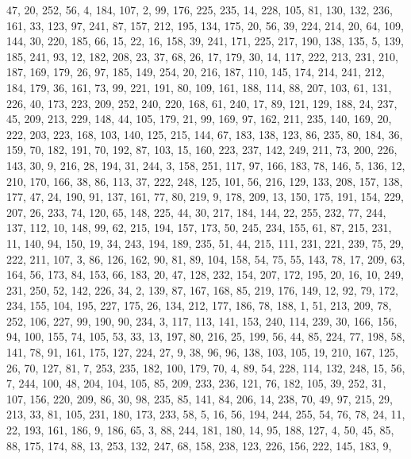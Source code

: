 \begin{DoxyCode}
       47, 20, 252, 56, 4, 184, 107, 2, 99, 176, 225, 235, 14, 228, 105, 81, 130, 132, 236, 161, 33, 123, 97, 241,
       87, 157, 212, 195, 134, 175, 20, 56, 39, 224, 214, 20, 64, 109, 144, 30, 220, 185, 66, 15, 22, 16, 158, 39,
       241, 171, 225, 217, 190, 138, 135, 5, 139, 185, 241, 93, 12, 182, 208, 23, 37, 68, 26, 17, 179, 30, 14, 117,
       222, 213, 231, 210, 187, 169, 179, 26, 97, 185, 149, 254, 20, 216, 187, 110, 145, 174, 214, 241, 212, 184,
       179, 36, 161, 73, 99, 221, 191, 80, 109, 161, 188, 114, 88, 207, 103, 61, 131, 226, 40, 173, 223, 209, 252,
       240, 220, 168, 61, 240, 17, 89, 121, 129, 188, 24, 237, 45, 209, 213, 229, 148, 44, 105, 179, 21, 99, 169, 97,
       162, 211, 235, 140, 169, 20, 222, 203, 223, 168, 103, 140, 125, 215, 144, 67, 183, 138, 123, 86, 235, 80,
       184, 36, 159, 70, 182, 191, 70, 192, 87, 103, 15, 160, 223, 237, 142, 249, 211, 73, 200, 226, 143, 30, 9,
       216, 28, 194, 31, 244, 3, 158, 251, 117, 97, 166, 183, 78, 146, 5, 136, 12, 210, 170, 166, 38, 86, 113, 37,
       222, 248, 125, 101, 56, 216, 129, 133, 208, 157, 138, 177, 47, 24, 190, 91, 137, 161, 77, 80, 219, 9, 178, 209,
       13, 150, 175, 191, 154, 229, 207, 26, 233, 74, 120, 65, 148, 225, 44, 30, 217, 184, 144, 22, 255, 232, 77,
       244, 137, 112, 10, 148, 99, 62, 215, 194, 157, 173, 50, 245, 234, 155, 61, 87, 215, 231, 11, 140, 94, 150,
       19, 34, 243, 194, 189, 235, 51, 44, 215, 111, 231, 221, 239, 75, 29, 222, 211, 107, 3, 86, 126, 162, 90, 81,
       89, 104, 158, 54, 75, 55, 143, 78, 17, 209, 63, 164, 56, 173, 84, 153, 66, 183, 20, 47, 128, 232, 154, 207,
       172, 195, 20, 16, 10, 249, 231, 250, 52, 142, 226, 34, 2, 139, 87, 167, 168, 85, 219, 176, 149, 12, 92, 79,
       172, 234, 155, 104, 195, 227, 175, 26, 134, 212, 177, 186, 78, 188, 1, 51, 213, 209, 78, 252, 106, 227, 99,
       190, 90, 234, 3, 117, 113, 141, 153, 240, 114, 239, 30, 166, 156, 94, 100, 155, 74, 105, 53, 33, 13, 197,
       80, 216, 25, 199, 56, 44, 85, 224, 77, 198, 58, 141, 78, 91, 161, 175, 127, 224, 27, 9, 38, 96, 96, 138, 103,
       105, 19, 210, 167, 125, 26, 70, 127, 81, 7, 253, 235, 182, 100, 179, 70, 4, 89, 54, 228, 114, 132, 248, 15,
       56, 7, 244, 100, 48, 204, 104, 105, 85, 209, 233, 236, 121, 76, 182, 105, 39, 252, 31, 107, 156, 220, 209,
       86, 30, 98, 235, 85, 141, 84, 206, 14, 238, 70, 49, 97, 215, 29, 213, 33, 81, 105, 231, 180, 173, 233, 58, 5,
       16, 56, 194, 244, 255, 54, 76, 78, 24, 11, 22, 193, 161, 186, 9, 186, 65, 3, 88, 244, 181, 180, 14, 95,
       188, 127, 4, 50, 45, 85, 88, 175, 174, 88, 13, 253, 132, 247, 68, 158, 238, 123, 226, 156, 222, 145, 183, 9,

\end{DoxyCode}
